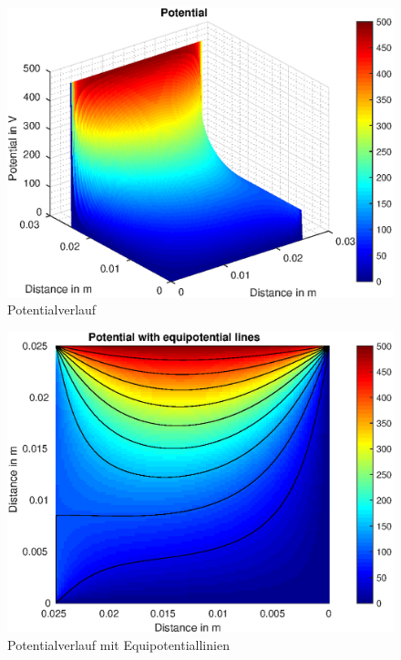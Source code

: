 \begin{figure}[H]
	\centering
	\includegraphics[scale=1]{pics/Bsp_1_b/fig_1.eps}
	\caption{Potentialverlauf}
\end{figure}

\begin{figure}[H]
	\centering
	\includegraphics[scale=1]{pics/Bsp_1_b/fig_2.eps}
	\caption{Potentialverlauf mit Equipotentiallinien}
\end{figure}

